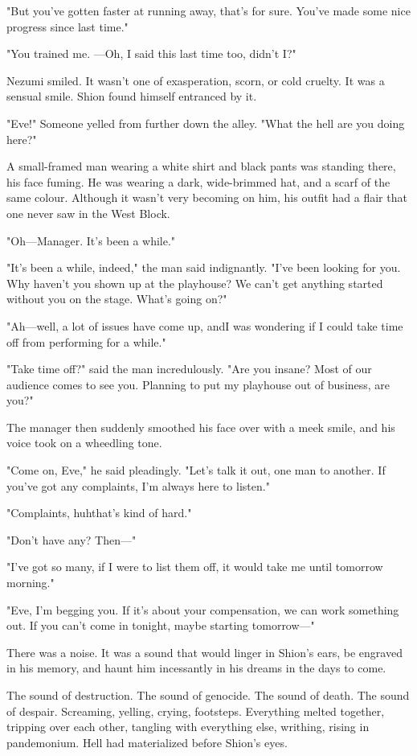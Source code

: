 "But you've gotten faster at running away, that's for sure. You've made
some nice progress since last time."

"You trained me. ---Oh, I said this last time too, didn't I?"

Nezumi smiled. It wasn't one of exasperation, scorn, or cold cruelty. It
was a sensual smile. Shion found himself entranced by it.

"Eve!" Someone yelled from further down the alley. "What the hell are
you doing here?"

A small-framed man wearing a white shirt and black pants was standing
there, his face fuming. He was wearing a dark, wide-brimmed hat, and a
scarf of the same colour. Although it wasn't very becoming on him, his
outfit had a flair that one never saw in the West Block.

"Oh---Manager. It's been a while."

"It's been a while, indeed," the man said indignantly. "I've been
looking for you. Why haven't you shown up at the playhouse? We can't get
anything started without you on the stage. What's going on?"

"Ah---well, a lot of issues have come up, and\el I was wondering if I
could take time off from performing for a while."

"Take time off?" said the man incredulously. "Are you insane? Most of
our audience comes to see you. Planning to put my playhouse out of
business, are you?"

The manager then suddenly smoothed his face over with a meek smile, and
his voice took on a wheedling tone.

"Come on, Eve," he said pleadingly. "Let's talk it out, one man to
another. If you've got any complaints, I'm always here to listen."

"Complaints, huh\el that's kind of hard."

"Don't have any? Then---"

"I've got so many, if I were to list them off, it would take me until
tomorrow morning."

"Eve, I'm begging you. If it's about your compensation, we can work
something out. If you can't come in tonight, maybe starting tomorrow---"

There was a noise. It was a sound that would linger in Shion's ears, be
engraved in his memory, and haunt him incessantly in his dreams in the
days to come.

The sound of destruction. The sound of genocide. The sound of death. The
sound of despair. Screaming, yelling, crying, footsteps. Everything
melted together, tripping over each other, tangling with everything
else, writhing, rising in pandemonium. Hell had materialized before
Shion's eyes.

